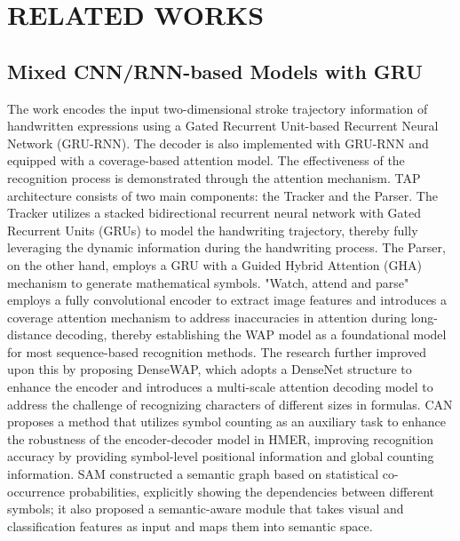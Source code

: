 \section{RELATED WORKS}
\subsection{Mixed CNN/RNN-based Models with GRU}
The work \cite{b14} encodes the input two-dimensional stroke trajectory information of handwritten expressions using a Gated Recurrent Unit-based Recurrent Neural Network (GRU-RNN). The decoder is also implemented with GRU-RNN and equipped with a coverage-based attention model. The effectiveness of the recognition process is demonstrated through the attention mechanism. TAP \cite{b15} architecture consists of two main components: the Tracker and the Parser. The Tracker utilizes a stacked bidirectional recurrent neural network with Gated Recurrent Units (GRUs) to model the handwriting trajectory, thereby fully leveraging the dynamic information during the handwriting process. The Parser, on the other hand, employs a GRU with a Guided Hybrid Attention (GHA) mechanism to generate mathematical symbols.  "Watch, attend and parse" \cite{b10} employs a fully convolutional encoder to extract image features and introduces a coverage attention mechanism to address inaccuracies in attention during long-distance decoding, thereby establishing the WAP model as a foundational model for most sequence-based recognition methods. The research \cite{b11} further improved upon this by proposing DenseWAP, which adopts a DenseNet structure to enhance the encoder and introduces a multi-scale attention decoding model to address the challenge of recognizing characters of different sizes in formulas. CAN \cite{b12} proposes a method that utilizes symbol counting as an auxiliary task to enhance the robustness of the encoder-decoder model in HMER, improving recognition accuracy by providing symbol-level positional information and global counting information. SAM \cite{b13} constructed a semantic graph based on statistical co-occurrence probabilities, explicitly showing the dependencies between different symbols; it also proposed a semantic-aware module that takes visual and classification features as input and maps them into semantic space. 

